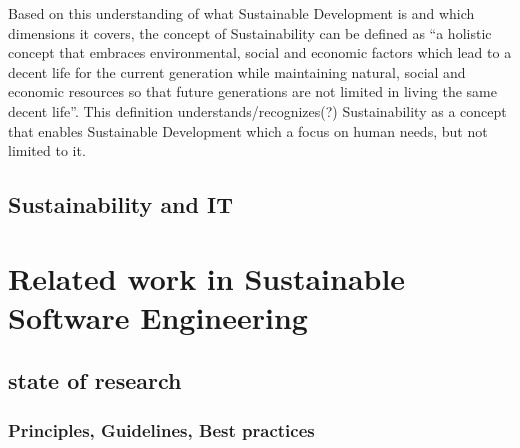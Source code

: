 Based on this understanding of what Sustainable Development is and which dimensions it covers, the concept of Sustainability can be defined as "`a holistic concept that embraces environmental, social and economic factors which lead to a decent life for the current generation while maintaining natural, social and economic resources so that future generations are not limited in living the same decent life"'.%
This definition understands/recognizes(?) Sustainability as a concept that enables Sustainable Development which a focus on human needs, but not limited to it.



\section{Sustainability and IT}  %



\chapter{Related work in Sustainable Software Engineering}
\section{state of research}



\subsection{Principles, Guidelines, Best practices}

